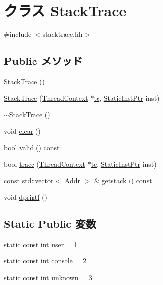 \hypertarget{classX86ISA_1_1StackTrace}{
\section{クラス StackTrace}
\label{classX86ISA_1_1StackTrace}
}


{\ttfamily \#include $<$stacktrace.hh$>$}\subsection*{Public メソッド}
\begin{DoxyCompactItemize}
\item 
\hyperlink{classX86ISA_1_1StackTrace_a5a9b2e3bba2262e73b20f87325efd063}{StackTrace} ()
\item 
\hyperlink{classX86ISA_1_1StackTrace_a7c751415d8c87372fc7d24513309cf1b}{StackTrace} (\hyperlink{classThreadContext}{ThreadContext} $\ast$\hyperlink{classX86ISA_1_1StackTrace_a4455a4759e69e5ebe68ae7298cbcc37d}{tc}, \hyperlink{classRefCountingPtr}{StaticInstPtr} inst)
\item 
\hyperlink{classX86ISA_1_1StackTrace_adec953886bb73db4f2ec91ed12810135}{$\sim$StackTrace} ()
\item 
void \hyperlink{classX86ISA_1_1StackTrace_ac8bb3912a3ce86b15842e79d0b421204}{clear} ()
\item 
bool \hyperlink{classX86ISA_1_1StackTrace_a8d985300b138b6c5556ab17ed4df3b38}{valid} () const 
\item 
bool \hyperlink{classX86ISA_1_1StackTrace_aabb136846a5e22007e44db846652ddd5}{trace} (\hyperlink{classThreadContext}{ThreadContext} $\ast$\hyperlink{classX86ISA_1_1StackTrace_a4455a4759e69e5ebe68ae7298cbcc37d}{tc}, \hyperlink{classRefCountingPtr}{StaticInstPtr} inst)
\item 
const \hyperlink{classstd_1_1vector}{std::vector}$<$ \hyperlink{base_2types_8hh_af1bb03d6a4ee096394a6749f0a169232}{Addr} $>$ \& \hyperlink{classX86ISA_1_1StackTrace_aceb93ba31a3756aca859b4643efeeb46}{getstack} () const 
\item 
void \hyperlink{classX86ISA_1_1StackTrace_a70fdc8802b54b4244889a2d3553405d5}{dprintf} ()
\end{DoxyCompactItemize}
\subsection*{Static Public 変数}
\begin{DoxyCompactItemize}
\item 
static const int \hyperlink{classX86ISA_1_1StackTrace_a80f5e5d52e325fee3fb197c8a15ff3b9}{user} = 1
\item 
static const int \hyperlink{classX86ISA_1_1StackTrace_ace24bfe6928bff7f701824622aa9b36e}{console} = 2
\item 
static const int \hyperlink{classX86ISA_1_1StackTrace_a204dd651615bf73491349b6403571f10}{unknown} = 3
\end{DoxyCompactItemize}
